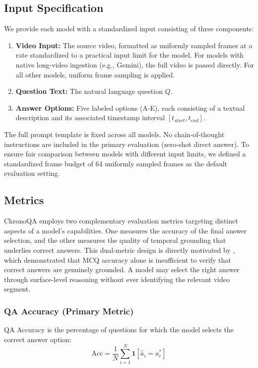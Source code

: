 \documentclass[sigconf,natbib=false,nonacm]{acmart}
\begin{document}
\subsection{Input Specification}

We provide each model with a standardized input consisting of three components:
\begin{enumerate}
  \item \textbf{Video Input:} The source video, formatted as uniformly sampled frames at a rate standardized to a practical input limit for the model. For models with native long-video ingestion (e.g., Gemini), the full video is passed directly. For all other models, uniform frame sampling is applied.
  \item \textbf{Question Text:} The natural language question $Q$.
  \item \textbf{Answer Options:} Five labeled options (A-E), each consisting of a textual description and its associated timestamp interval $[t_{start}, t_{end}]$.
\end{enumerate}

The full prompt template is fixed across all models. No chain-of-thought instructions are included in the primary evaluation (zero-shot direct answer). To ensure fair comparison between models with different input limits, we defined a standardized frame budget of 64 uniformly sampled frames as the default evaluation setting.

\subsection{Metrics}

ChronoQA employs two complementary evaluation metrics targeting distinct aspects of a model's capabilities. One measures the accuracy of the final answer selection, and the other measures the quality of temporal grounding that underlies correct answers. This dual-metric design is directly motivated by \cite{cgbench}, which demonstrated that MCQ accuracy alone is insufficient to verify that correct answers are genuinely grounded. A model may select the right answer through surface-level reasoning without ever identifying the relevant video segment.

\subsubsection{QA Accuracy (Primary Metric)}
QA Accuracy is the percentage of questions for which the model selects the correct answer option:
\begin{equation}
  \text{Acc} = \frac{1}{N} \sum_{i=1}^{N} \mathbf{1}[\hat{a}_i = a_i^*]
\end{equation}
\end{document}
